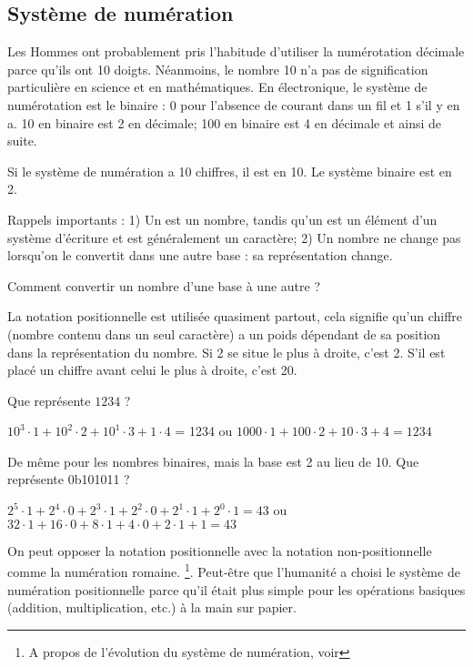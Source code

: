 ﻿%
\subsection{Système de numération}

Les Hommes ont probablement pris l'habitude d'utiliser la numérotation décimale parce qu'ils ont 10 doigts.
Néanmoins, le nombre 10 n'a pas de signification particulière en science et en mathématiques.
En électronique, le système de numérotation est le binaire : 0 pour l'absence de courant dans un fil et 1 s'il y en a.
10 en binaire est 2 en décimale; 100 en binaire est 4 en décimale et ainsi de suite.

Si le système de numération a 10 chiffres, il est en  10. %
Le système binaire est en  2.

Rappels importants :
1) Un  est un nombre, tandis qu'un  est un élément d'un système d'écriture et est généralement un caractère;
2) Un nombre ne change pas lorsqu'on le convertit dans une autre base : sa représentation change.

Comment convertir un nombre d'une base à une autre ?

La notation positionnelle est utilisée quasiment partout, cela signifie qu'un chiffre (nombre contenu dans un seul caractère) a
un poids dépendant de sa position dans la représentation du nombre.
Si 2 se situe le plus à droite, c'est 2.
S'il est placé un chiffre avant celui le plus à droite, c'est 20.

Que représente $1234$ ?

$10^3 \cdot 1 + 10^2 \cdot 2 + 10^1 \cdot 3 + 1 \cdot 4$ = 1234 ou 
$1000 \cdot 1 + 100 \cdot 2 + 10 \cdot 3 + 4 = 1234$

De même pour les nombres binaires, mais la base est 2 au lieu de 10.
Que représente 0b101011 ?

$2^5 \cdot 1 + 2^4 \cdot 0 + 2^3 \cdot 1 + 2^2 \cdot 0 + 2^1 \cdot 1 + 2^0 \cdot 1 = 43$ ou
$32 \cdot 1 + 16 \cdot 0 + 8 \cdot 1 + 4 \cdot 0 + 2 \cdot 1 + 1 = 43$

On peut opposer la notation positionnelle avec la notation non-positionnelle comme la numération romaine.
\footnote{A propos de l'évolution du système de numération, voir }.
Peut-être que l'humanité a choisi le système de numération positionnelle parce qu'il était plus simple pour les opérations basiques (addition, multiplication, etc.) à la main sur papier.


